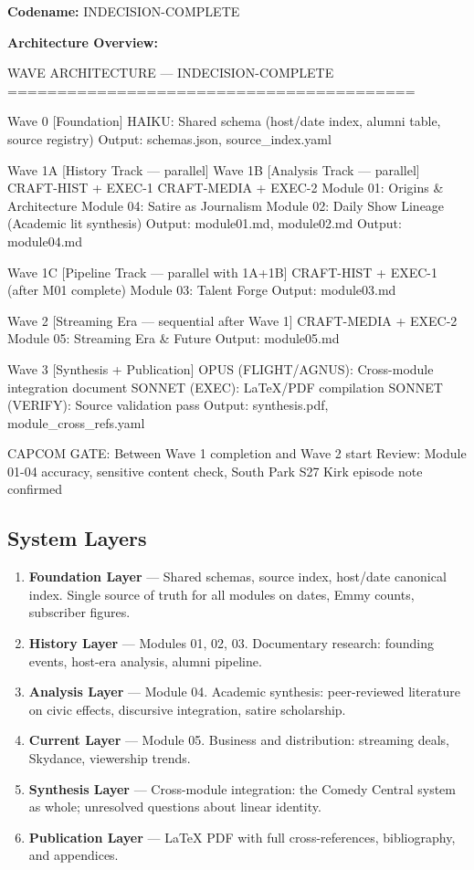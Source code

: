 \documentclass[11pt,letterpaper]{article}
\begin{document}
\textbf{Codename:} INDECISION-COMPLETE

\textbf{Architecture Overview:}

\begin{asciibox}
WAVE ARCHITECTURE — INDECISION-COMPLETE
=========================================

Wave 0 [Foundation]
  HAIKU: Shared schema (host/date index, alumni table, source registry)
  Output: schemas.json, source_index.yaml

Wave 1A [History Track — parallel]         Wave 1B [Analysis Track — parallel]
  CRAFT-HIST + EXEC-1                         CRAFT-MEDIA + EXEC-2
  Module 01: Origins & Architecture           Module 04: Satire as Journalism
  Module 02: Daily Show Lineage               (Academic lit synthesis)
  Output: module01.md, module02.md            Output: module04.md

Wave 1C [Pipeline Track — parallel with 1A+1B]
  CRAFT-HIST + EXEC-1 (after M01 complete)
  Module 03: Talent Forge
  Output: module03.md

Wave 2 [Streaming Era — sequential after Wave 1]
  CRAFT-MEDIA + EXEC-2
  Module 05: Streaming Era & Future
  Output: module05.md

Wave 3 [Synthesis + Publication]
  OPUS (FLIGHT/AGNUS): Cross-module integration document
  SONNET (EXEC): LaTeX/PDF compilation
  SONNET (VERIFY): Source validation pass
  Output: synthesis.pdf, module_cross_refs.yaml

CAPCOM GATE: Between Wave 1 completion and Wave 2 start
  Review: Module 01-04 accuracy, sensitive content check,
           South Park S27 Kirk episode note confirmed
\end{asciibox}

\subsection{System Layers}

\begin{enumerate}
  \item \textbf{Foundation Layer} --- Shared schemas, source index, host/date canonical index. Single source of truth for all modules on dates, Emmy counts, subscriber figures.
  \item \textbf{History Layer} --- Modules 01, 02, 03. Documentary research: founding events, host-era analysis, alumni pipeline.
  \item \textbf{Analysis Layer} --- Module 04. Academic synthesis: peer-reviewed literature on civic effects, discursive integration, satire scholarship.
  \item \textbf{Current Layer} --- Module 05. Business and distribution: streaming deals, Skydance, viewership trends.
  \item \textbf{Synthesis Layer} --- Cross-module integration: the Comedy Central system as whole; unresolved questions about linear identity.
  \item \textbf{Publication Layer} --- LaTeX PDF with full cross-references, bibliography, and appendices.
\end{enumerate}
\end{document}
